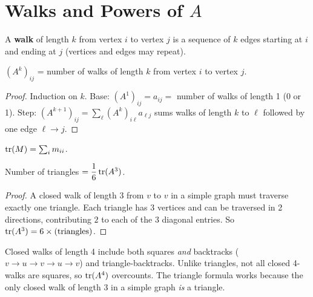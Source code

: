 \section{Walks and Powers of $A$}

\begin{definition}[Walk]
A \textbf{walk} of length $k$ from vertex $i$ to vertex $j$ is a sequence of $k$ edges starting at $i$ and ending at $j$ (vertices and edges may repeat).
\end{definition}

\begin{theorem}
$(A^k)_{ij}$ = number of walks of length $k$ from vertex $i$ to vertex $j$.
\end{theorem}

\begin{proof}
Induction on $k$. Base: $(A^1)_{ij}=a_{ij}=$ number of walks of length 1 (0 or 1). Step: $(A^{k+1})_{ij}=\sum_\ell(A^k)_{i\ell}a_{\ell j}$ sums walks of length $k$ to $\ell$ followed by one edge $\ell\to j$.
\end{proof}

\begin{definition}[Trace]
$\operatorname{tr}(M)=\sum_i m_{ii}$.
\end{definition}

\begin{theorem}
Number of triangles $= \dfrac{1}{6}\operatorname{tr}(A^3)$.
\end{theorem}

\begin{proof}
A closed walk of length 3 from $v$ to $v$ in a simple graph must traverse exactly one triangle. Each triangle has 3 vertices and can be traversed in 2 directions, contributing $2$ to each of the 3 diagonal entries. So $\operatorname{tr}(A^3)=6\times(\text{triangles})$.
\end{proof}

\begin{remark}
Closed walks of length 4 include both squares \textit{and} backtracks ($v\!\to\!u\!\to\!v\!\to\!u\!\to\!v$) and triangle-backtracks. Unlike triangles, not all closed 4-walks are squares, so $\operatorname{tr}(A^4)$ overcounts. The triangle formula works because the only closed walk of length 3 in a simple graph \emph{is} a triangle.
\end{remark}

